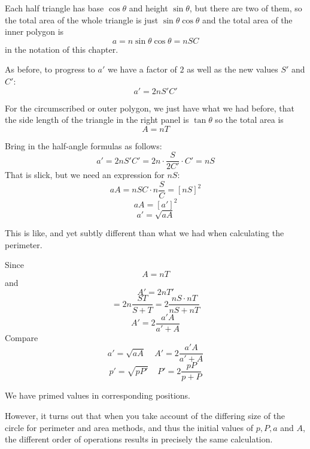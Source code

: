\documentclass[11pt, oneside]{article}
\begin{document}
Each half triangle has base $\cos \theta$ and height $\sin \theta$, but there are two of them, so the total area of the whole triangle is just $\sin \theta \cos \theta$ and the total area of the inner polygon is
\[ a = n \sin \theta \cos \theta = n SC \]
in the notation of this chapter.  

As before, to progress to $a'$ we have a factor of $2$ as well as the new values $S'$ and $C'$:
\[ a' = 2n S'C' \]

For the circumscribed or outer polygon, we just have what we had before, that the side length of the triangle in the right panel is $\tan \theta$ so the total area is
\[ A = nT \]

Bring in the half-angle formulas as follows:
\[ a' = 2n S'C' = 2n \cdot \frac{S}{2C'} \cdot C' = nS \]
That is slick, but we need an expression for $nS$:
\[ aA = nSC \cdot n \frac{S}{C} = [nS]^2 \]
\[ aA = [a']^2 \]
\[ a' = \sqrt{aA} \]

This is like, and yet subtly different than what we had when calculating the perimeter.

Since
\[ A = nT \]
and
\[ A' = 2nT' \]
\[ = 2n \frac{ST}{S + T} = 2 \frac{nS \cdot nT}{nS + nT} \]
\[ A' = 2 \frac{a'A}{a' + A} \]
Compare
\[ a' = \sqrt{aA}  \ \ \ \ \  A' = 2 \frac{a'A}{a' + A} \]
\[ p' = \sqrt{pP'}  \ \ \ \ \   P' = 2 \frac{pP}{p + P} \]

We have primed values in corresponding positions.

However, it turns out that when you take account of the differing size of the circle for perimeter and area methods, and thus the initial values of $p,P,a$ and $A$, the different order of operations results in precisely the same calculation.
\end{document}
